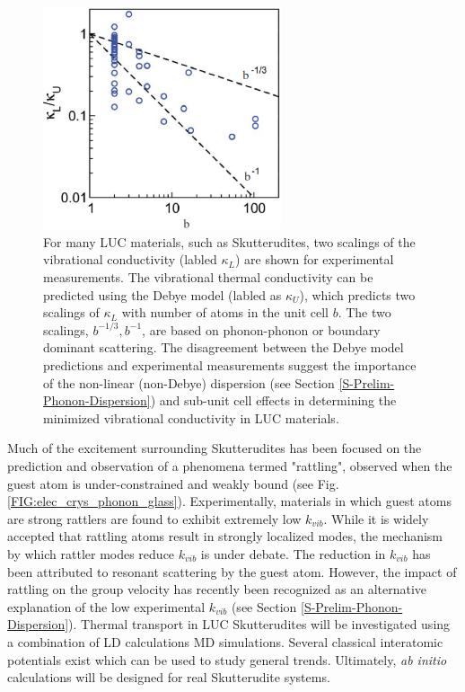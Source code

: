 \documentclass[letterpaper,12pt]{article}
\begin{document}
\begin{figure}
\begin{center}
\includegraphics[angle=0,width=70.0mm]{snyder_kl_ku-1.eps}
\vspace*{-5mm}
\end{center}
\caption{\label{FIG:snyder-kl} For many LUC materials, such as Skutterudites, two scalings of the vibrational conductivity
(labled $\kappa_{L}$) are shown for experimental measurements.\cite{Toberer2011} The vibrational thermal conductivity can be predicted using the Debye model (labled as $\kappa_{U}$), which predicts two
scalings of $\kappa_{L}$ with number of atoms in the unit cell $b$. The two scalings, $b^{-1/3},b^{-1}$, are based on phonon-phonon or boundary dominant scattering.\cite{Toberer2011} The disagreement between the Debye model predictions and experimental measurements suggest the importance of the non-linear (non-Debye) dispersion (see Section \ref{S-Prelim-Phonon-Dispersion}) and sub-unit cell effects in determining the minimized vibrational conductivity in LUC materials.}
\end{figure}
Much of the excitement surrounding Skutterudites has been
focused on the prediction and observation of a phenomena termed "rattling", observed when the guest atom
is under-constrained and weakly bound (see Fig. \ref{FIG:elec_crys_phonon_glass}).\cite{keppens1998,Sales_Chakoumakos_Mandrus_Sharp_1999,doi:10.1021/ja063695y} Experimentally, materials in which guest atoms are strong rattlers are found to exhibit extremely low $k_{vib}$.\cite{Sales_Chakoumakos_Mandrus_Sharp_1999,qiu:063713} While it is widely accepted that rattling atoms result in strongly localized modes, the mechanism by which rattler modes reduce $k_{vib}$ is under debate. The reduction in $k_{vib}$ has been attributed to resonant scattering by the guest atom.\cite{PhysRevLett.82.779} However, the impact of rattling on the group velocity has recently been recognized as an alternative explanation of the low experimental $k_{vib}$ (see Section \ref{S-Prelim-Phonon-Dispersion}).\cite{Yang_Chen_2006,Christensen2008}
Thermal transport in LUC Skutterudites will be investigated using a combination of LD calculations MD simulations. Several classical interatomic potentials exist which can be used to study general trends.\cite{PhysRevB.82.195207,PhysRevB.81.134301} Ultimately, \emph{ab initio} calculations will be designed for real Skutterudite systems.
\end{document}
